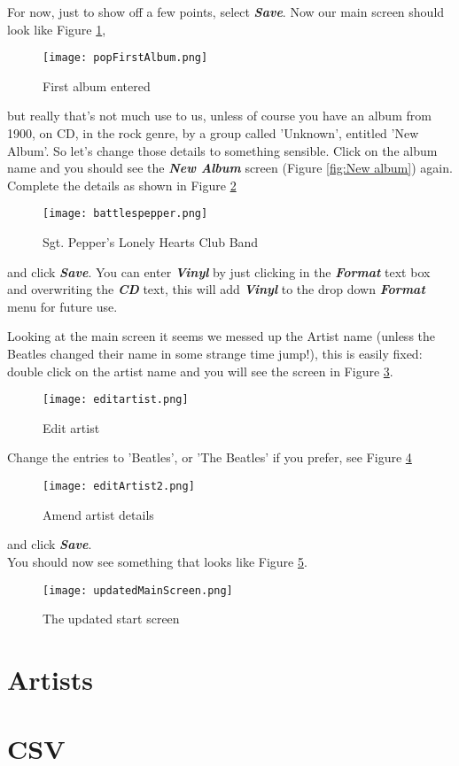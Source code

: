 \newpage 
For now, just to show off a few points, select
\textbf{\textit{Save}}.
Now our main screen should look like Figure
\ref{fig:First album entered},
\begin{figure}[!ht]
 \texttt{[image: popFirstAlbum.png]} 
 \caption{First album entered}
 \label{fig:First album entered}
\end{figure}
but really that's not much use to us, unless of course you have an album from 1900, on CD, in the rock genre, by a group called 'Unknown', entitled 'New Album'.  So let's change those details to something sensible. Click on the album name and you should see the
\textit{\textbf{New Album}}
screen (Figure 
\ref{fig:New album})
again.  Complete the details as shown in Figure
\ref{fig:Sgt. Pepper's Lonely Hearts Club Band}
\begin{figure}[!ht]
 \texttt{[image: battlespepper.png]}
 \caption{Sgt. Pepper's Lonely Hearts Club Band}
 \label{fig:Sgt. Pepper's Lonely Hearts Club Band}
\end{figure}
and click 
\textbf{\textit{Save}}.
You can enter
\textbf{\textit{Vinyl}}
by just clicking in the
\textbf{\textit{Format}}
text box and overwriting the
\textbf{\textit{CD}}
text, this will add
\textbf{\textit{Vinyl}}
to the drop down 
\textbf{\textit{Format}}
menu for future use.

Looking at the main screen it seems we messed up the Artist name (unless the Beatles changed their name in some strange time jump!), this is easily fixed: double click on the artist name and you will see the screen in Figure
\ref{fig:Edit artist}.
\begin{figure}[!ht]
 \texttt{[image: editartist.png]}
 \caption{Edit artist}
 \label{fig:Edit artist}
\end{figure} 
\newpage
Change the entries to 'Beatles', or 'The Beatles' if you prefer, see Figure
\ref{fig:Corrected artist}
\begin{figure}[!ht]
 \texttt{[image: editArtist2.png]}
 \caption{Amend artist details}
 \label{fig:Corrected artist}
\end{figure} 
and click 
\textbf{\textit{Save}}.
\\You should now see something that looks like Figure
\ref{fig:Updated start screen}.
\begin{figure}[!ht]
 \texttt{[image: updatedMainScreen.png]}
 \caption{The updated start screen}
 \label{fig:Updated start screen}
\end{figure} 
\newpage
\section{Artists}
\section{CSV}
\label{sect:csv}